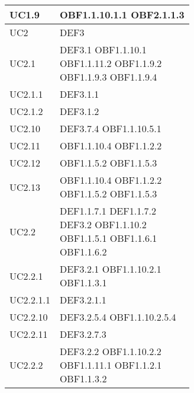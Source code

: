 \documentclass{scalatekids-article}
\begin{document}
\begin{longtable}[H]{|p{5.5cm}|p{5.5cm}|}
  \hline
  UC1.9 & \multiLineCell[t]{OBF1.1.10.1.1 OBF2.1.1.3\\}\\
  \hline
  UC2 & \multiLineCell[t]{DEF3\\}\\
  \hline
  UC2.1 & \multiLineCell[t]{DEF3.1 OBF1.1.10.1\\OBF1.1.11.2 OBF1.1.9.2\\OBF1.1.9.3 OBF1.1.9.4\\}\\
  \hline
  UC2.1.1 & \multiLineCell[t]{DEF3.1.1\\}\\
  \hline
  UC2.1.2 & \multiLineCell[t]{DEF3.1.2\\}\\
  \hline
  UC2.10 & \multiLineCell[t]{DEF3.7.4 OBF1.1.10.5.1\\}\\
  \hline
  UC2.11 & \multiLineCell[t]{OBF1.1.10.4 OBF1.1.2.2\\}\\
  \hline
  UC2.12 & \multiLineCell[t]{OBF1.1.5.2 OBF1.1.5.3\\}\\
  \hline
  UC2.13 & \multiLineCell[t]{OBF1.1.10.4 OBF1.1.2.2\\OBF1.1.5.2 OBF1.1.5.3\\}\\
  \hline
  UC2.2 & \multiLineCell[t]{DEF1.1.7.1 DEF1.1.7.2\\DEF3.2 OBF1.1.10.2\\OBF1.1.5.1 OBF1.1.6.1\\OBF1.1.6.2\\}\\
  \hline
  UC2.2.1 & \multiLineCell[t]{DEF3.2.1 OBF1.1.10.2.1\\OBF1.1.3.1\\}\\
  \hline
  UC2.2.1.1 & \multiLineCell[t]{DEF3.2.1.1\\}\\
  \hline
  UC2.2.10 & \multiLineCell[t]{DEF3.2.5.4 OBF1.1.10.2.5.4\\}\\
  \hline
  UC2.2.11 & \multiLineCell[t]{DEF3.2.7.3\\}\\
  \hline
  UC2.2.2 & \multiLineCell[t]{DEF3.2.2 OBF1.1.10.2.2\\OBF1.1.11.1 OBF1.1.2.1\\OBF1.1.3.2\\}\\

\end{longtable}
\end{document}
